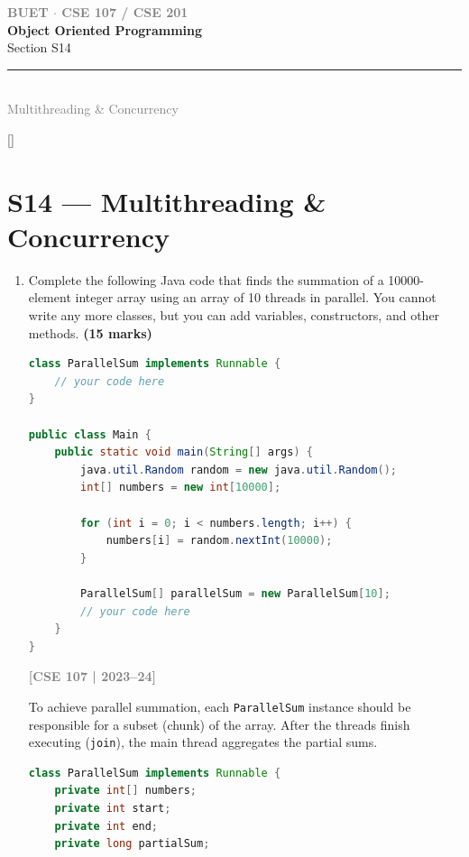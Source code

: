 \documentclass[12pt,a3paper]{article}
\newcommand{\yr}[1]{\hfill\textcolor{gray}{\small\textbf{[#1]}}}
\newcommand{\mk}[1]{\textcolor{orange!70!black}{\small\textbf{(#1 marks)}}}
\newcommand{\secdivider}[4]{%
  \newpage\thispagestyle{empty}%
  \vspace*{\fill}%
  \begin{tcolorbox}[enhanced,colback=#4!7,colframe=#3,boxrule=1.5pt,arc=8pt,
    left=20pt,right=20pt,top=22pt,bottom=22pt,
    shadow={3pt}{-3pt}{0pt}{black!15}]
    \centering
    {\large\textcolor{gray}{\textbf{BUET $\cdot$ CSE 107 / CSE 201}}}\\[8pt]
    {\fontsize{26}{32}\selectfont\bfseries\textcolor{#3}{Object Oriented Programming}}\\[6pt]
    {\fontsize{15}{19}\selectfont\textcolor{dgray}{#1}}\\[12pt]
    \textcolor{#3!60}{\rule{0.5\textwidth}{0.5pt}}\\[6pt]
    {\small\textcolor{gray}{#2}}
  \end{tcolorbox}%
  \vspace*{\fill}\newpage%
}
\begin{document}
\secdivider{Section S14}{Multithreading \& Concurrency}{cF}{cF}
\label{sec:S14}
\titleformat{\section}{\large\bfseries\color{cF}}{}{0em}{}[\titlerule]
\section{S14 --- Multithreading \& Concurrency}

\begin{enumerate}

\item Complete the following Java code that finds the summation of a 10000-element integer array using an array of 10 threads in parallel. You cannot write any more classes, but you can add variables, constructors, and other methods. \mk{15}
\begin{lstlisting}[language=Java]
class ParallelSum implements Runnable {
    // your code here
}

public class Main {
    public static void main(String[] args) {
        java.util.Random random = new java.util.Random();
        int[] numbers = new int[10000];
        
        for (int i = 0; i < numbers.length; i++) {
            numbers[i] = random.nextInt(10000);
        }
        
        ParallelSum[] parallelSum = new ParallelSum[10];
        // your code here
    }
}
\end{lstlisting}
\yr{CSE 107 | 2023--24}

\begin{tcolorbox}[enhanced,breakable,ansbox,
  colback=cF!4,colframe=cF,boxrule=0.8pt,arc=5pt,
  title={\textbf{Answer --- Parallel Sum of 10,000-Element Array (10 Threads)}},
  fonttitle=\bfseries\color{white},colbacktitle=cF]

To achieve parallel summation, each \texttt{ParallelSum} instance should be responsible for a subset (chunk) of the array. After the threads finish executing (\texttt{join}), the main thread aggregates the partial sums.

\begin{lstlisting}[language=Java]
class ParallelSum implements Runnable {
    private int[] numbers;
    private int start;
    private int end;
    private long partialSum;


\end{lstlisting}
\end{tcolorbox}
\end{enumerate}
\end{document}
